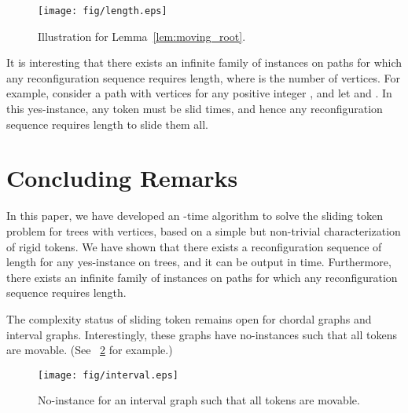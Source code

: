 \documentclass{llncs}
\begin{document}
\begin{figure}[t]
\begin{center}
	\texttt{[image: fig/length.eps]}
	\end{center}
	\vspace{-1em}
	\caption{Illustration for Lemma~\ref{lem:moving_root}.}
	\label{fig:length}
\end{figure}


It is interesting that there exists an infinite family of instances on paths
for which any reconfiguration sequence requires  length,
where  is the number of vertices. 
For example, consider a path  with  vertices for any positive integer , and
let  and .
In this yes-instance, any token must be slid  times, 
and hence any reconfiguration sequence requires  length to slide them all.




\section{Concluding Remarks}

	In this paper, we have developed an -time algorithm to solve the {\sc sliding token} problem for trees with  vertices, based on a simple but non-trivial characterization of rigid tokens. 
	We have shown that there exists a reconfiguration sequence of length  for any yes-instance on trees, and it can be output in  time. 
	Furthermore, there exists an infinite family of instances on paths for which any reconfiguration sequence requires  length.

	The complexity status of {\sc sliding token} remains open for chordal graphs and interval graphs.
	Interestingly, these graphs have no-instances such that all tokens are movable. 
(See \figurename~\ref{fig:interval} for example.) 

\begin{figure}[t]
\begin{center}
	\texttt{[image: fig/interval.eps]}
	\end{center}
	\vspace{-1em}
	\caption{No-instance for an interval graph such that all tokens are movable.}
	\label{fig:interval}
\end{figure}
\end{document}
